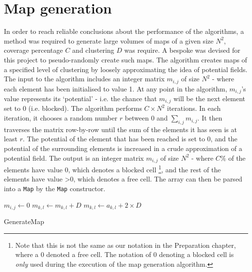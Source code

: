 \documentclass[12pt,notitlepage]{report}
\begin{document}
\newpage
\section{Map generation}

In order to reach reliable conclusions about the performance of the algorithms, a method was required to generate large volumes of maps of a given size $N^{2}$, coverage percentage $C$ and clustering $D$ was require. A bespoke was devised for this project to pseudo-randomly create such maps. The algorithm creates maps of a specified level of clustering by loosely approximating the idea of potential fields.\\

\noindent
The input to the algorithm includes an integer matrix $m_{i,j}$ of size $N^{2}$ - where each element has been initialised to value 1. At any point in the algorithm, $m_{i,j}$'s value represents its `potential' - i.e. the chance that $m_{i,j}$ will be the next element set to 0 (i.e. blocked). The algorithm performs $C \times N^{2}$ iterations. In each iteration, it chooses a random number $r$ between $0$ and $\sum\limits_{i,j} m_{i,j}$. It then traverses the matrix row-by-row until the sum of the elements it has seen is at least $r$. The potential of the element that has been reached is set to $0$, and the potential of the surrounding elements is increased in a crude approximation of a potential field. The output is an integer matrix $m_{i,j}$ of size $N^{2}$ - where $C\%$ of the elements have value 0, which denotes a blocked cell \footnote{Note that this is not the same as our notation in the Preparation chapter, where a 0 denoted a free cell. The notation of 0 denoting a blocked cell is {\em only} used during the execution of the map generation algorithm.}, and the rest of the elements have value \textgreater $0$, which denotes a free cell. The array can then be parsed into a {\tt Map} by the {\tt Map} constructor.

\begin{algorithm}[htp]
  \SetAlgoLined\DontPrintSemicolon
   
   {
    \nl $m_{i,j} \gets 0$\;
    \nl {} {
      \nl {} {
        \nl $m_{k,l} \gets m_{k,l} + D$\;
      }
  }
  \nl {} {
      \nl {} {
        $m_{k,l} \gets a_{k,l} + 2\times D$\;
      }
  }
}
\caption{{\sc GenerateMap}}
 \end{algorithm} 
 
\end{document}
